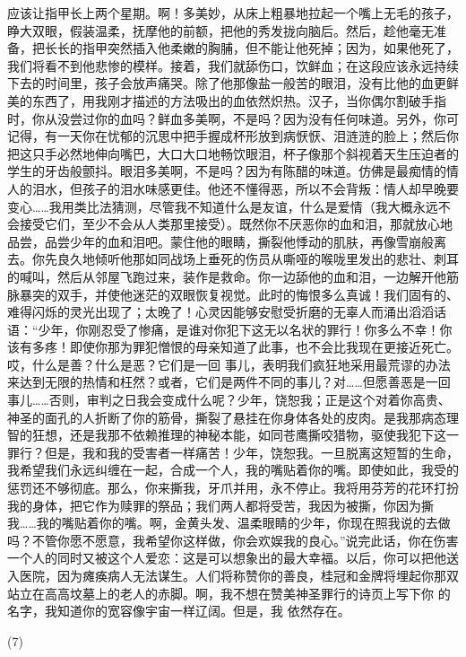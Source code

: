 \documentclass{article}
\begin{document}
应该让指甲长上两个星期。啊！多美妙，从床上粗暴地拉起一个嘴上无毛的孩子，睁大双眼，假装温柔，抚摩他的前额，把他的秀发拢向脑后。然后，趁他毫无准备，把长长的指甲突然插入他柔嫩的胸脯，但不能让他死掉；因为，如果他死了，我们将看不到他悲惨的模样。接着，我们就舔伤口，饮鲜血；在这段应该永远持续下去的时间里，孩子会放声痛哭。除了他那像盐一般苦的眼泪，没有比他的血更鲜美的东西了，用我刚才描述的方法吸出的血依然炽热。汉子，当你偶尔割破手指时，你从没尝过你的血吗？鲜血多美啊，不是吗？因为没有任何味道。另外，你可
\newpage
记得，有一天你在忧郁的沉思中把手握成杯形放到病恹恹、泪涟涟的脸上；然后你把这只手必然地伸向嘴巴，大口大口地畅饮眼泪，杯子像那个斜视着天生压迫者的学生的牙齿般颤抖。眼泪多美啊，不是吗？因为有陈醋的味道。仿佛是最痴情的情人的泪水，但孩子的泪水味感更佳。他还不懂得恶，所以不会背叛：情人却早晚要变心……我用类比法猜测，尽管我不知道什么是友谊，什么是爱情（我大概永远不会接受它们，至少不会从人类那里接受）。既然你不厌恶你的血和泪，那就放心地品尝，品尝少年的血和泪吧。蒙住他的眼睛，撕裂他悸动的肌肤，再像雪崩般离去。你先良久地倾听他那如同战场上垂死的伤员从嘶哑的喉咙里发出的悲壮、刺耳的喊叫，然后从邻屋飞跑过来，装作是救命。你一边舔他的血和泪，一边解开他筋脉暴突的双手，并使他迷茫的双眼恢复视觉。此时的悔恨多么真诚！我们固有的、难得闪烁的灵光出现了；太晚了！心灵因能够安慰受折磨的无辜人而涌出滔滔话语：“少年，你刚忍受了惨痛，是谁对你犯下这无以名状的罪行！你多么不幸！你该有多疼！即使你那为罪犯憎恨的母亲知道了此事，也不会比我现在更接近死亡。哎，什么是善？什么是恶？它们是一回
\newpage
事儿，表明我们疯狂地采用最荒谬的办法来达到无限的热情和枉然？或者，它们是两件不同的事儿？对……但愿善恶是一回事儿……否则，审判之日我会变成什么呢？少年，饶恕我；正是这个对着你高贵、神圣的面孔的人折断了你的筋骨，撕裂了悬挂在你身体各处的皮肉。是我那病态理智的狂想，还是我那不依赖推理的神秘本能，如同苍鹰撕咬猎物，驱使我犯下这一罪行？但是，我和我的受害者一样痛苦！少年，饶恕我。一旦脱离这短暂的生命，我希望我们永远纠缠在一起，合成一个人，我的嘴贴着你的嘴。即使如此，我受的惩罚还不够彻底。那么，你来撕我，牙爪并用，永不停止。我将用芬芳的花环打扮我的身体，把它作为赎罪的祭品；我们两人都将受苦，我因为被撕，你因为撕我……我的嘴贴着你的嘴。啊，金黄头发、温柔眼睛的少年，你现在照我说的去做吗？不管你愿不愿意，我希望你这样做，你会欢娱我的良心。”说完此话，你在伤害一个人的同时又被这个人爱恋：这是可以想象出的最大幸福。以后，你可以把他送入医院，因为瘫痪病人无法谋生。人们将称赞你的善良，桂冠和金牌将埋起你那双站立在高高坟墓上的老人的赤脚。啊，我不想在赞美神圣罪行的诗页上写下你
\newpage
的名字，我知道你的宽容像宇宙一样辽阔。但是，我
依然存在。 


(7) 
\end{document}

